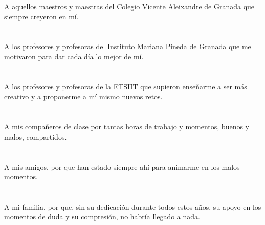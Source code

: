 A aquellos maestros y maestras del Colegio Vicente Aleixandre de Granada que siempre creyeron en mí.\\ \\ \\

A los profesores y profesoras del Instituto Mariana Pineda de Granada que me motivaron para
dar cada día lo mejor de mí.\\ \\ \\

A los profesores y profesoras de la ETSIIT que supieron enseñarme a ser más creativo y a proponerme a mí mismo nuevos retos.\\ \\ \\

A mis compañeros de clase por tantas horas de trabajo y momentos, buenos y malos, compartidos.\\ \\ \\

A mis amigos, por que han estado siempre ahí para animarme en los malos momentos.\\ \\ \\

A mi familia, por que, sin su dedicación durante todos estos años, su apoyo en los momentos
de duda y su compresión, no habría llegado a nada.
